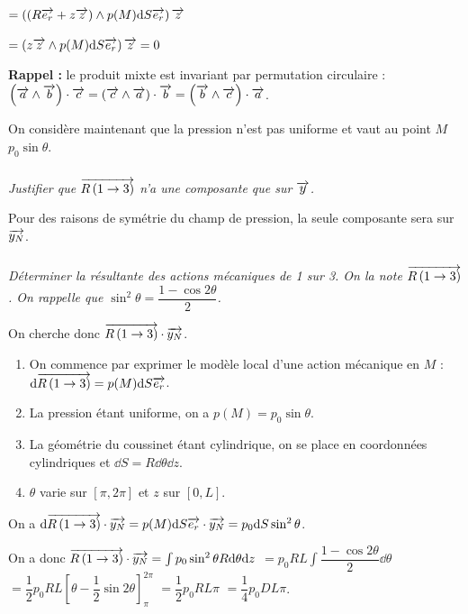 \documentclass[10pt,fleqn]{article} %
\begin{document}
\begin{multicols}{2}
\begin{multicols}{2}
\begin{corrige}
$ = \left( \left( R\overrightarrow{e_r}+z\overrightarrow{z} \right) \wedge  p(M) \text{d} S \overrightarrow{e_r}\right) \overrightarrow{z}$

$ = \left(z\overrightarrow{z} \wedge  p(M) \text{d} S \overrightarrow{e_r}\right) \overrightarrow{z} = 0$


\textbf{Rappel :} le produit mixte est invariant par permutation circulaire : $\left( \overrightarrow{a}\wedge \overrightarrow{b}\right)\cdot \overrightarrow{c} = \left( \overrightarrow{c}\wedge \overrightarrow{a}\right)\cdot \overrightarrow{b} = \left( \overrightarrow{b}\wedge \overrightarrow{c}\right)\cdot \overrightarrow{a}$.
\end{corrige}
\else
\fi

\vspace{.5cm}

On considère maintenant que la pression n'est pas uniforme et vaut au point $M$ $p_0\sin\theta$.
\subparagraph{}\textit{Justifier que  $\overrightarrow{R\left( {1} \rightarrow {3}\right)}$ n'a une composante que sur $\overrightarrow{y}$.}
\ifprof
\begin{corrige}
Pour des raisons de symétrie du champ de pression, la seule composante sera sur $\overrightarrow{y_N}$.
\end{corrige}
\else
\fi


\subparagraph{}\textit{Déterminer la résultante des actions mécaniques de 1 sur 3. On la note $\overrightarrow{R\left( {1} \rightarrow {3}\right)}$. On rappelle que $\sin^2\theta =\dfrac{1-\cos 2\theta }{2}$. }
\ifprof
\begin{corrige}
On cherche donc $\overrightarrow{R\left( {1} \rightarrow {3}\right)} \cdot \overrightarrow{y_N}$.
\begin{enumerate}
\item On commence par exprimer le modèle local d'une action mécanique en $M$ : $\text{d} \overrightarrow{R\left( {1} \rightarrow {3}\right)} = p(M) \text{d} S \overrightarrow{e_r}$.
\item La pression étant uniforme, on a $p(M)=p_0 \sin\theta$.
\item La géométrie du coussinet étant cylindrique, on se place en coordonnées cylindriques et $\dd S = R\dd \theta \dd z$.  
\item $\theta$ varie sur $[\pi, 2\pi]$ et $z$ sur $[0,L]$. 
\end{enumerate}

On a  $\text{d} \overrightarrow{R\left( {1} \rightarrow {3}\right)} \cdot \overrightarrow{y_N} = p(M) \text{d} S \overrightarrow{e_r} \cdot \overrightarrow{y_N} =p_0 \text{d} S  \sin^2 \theta $. 

On a donc $\overrightarrow{R\left( {1} \rightarrow {3}\right)} \cdot \overrightarrow{y_N} = \int  p_0  \sin^2 \theta  R\text{d} \theta \text{d} z $
$ =   p_0 R L \int \dfrac{1-\cos 2\theta }{2}   \dd \theta$
$ =   \dfrac{1}{2}p_0 R L \left[\theta-\dfrac{1}{2}\sin 2\theta \right]^{2\pi}_{\pi} $
$ =   \dfrac{1}{2}p_0 R L {\pi} $
$ =   \dfrac{1}{4}p_0 D L {\pi} $.
\end{corrige}
\else
\fi


\end{multicols}
\end{multicols}
\end{document}
